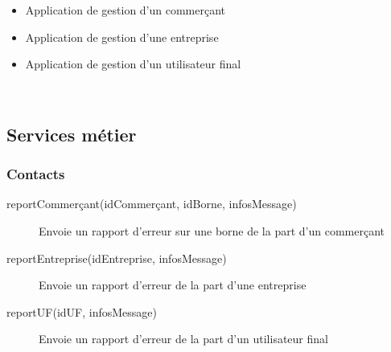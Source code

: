 \begin{itemize}
  \item Application de gestion d'un commerçant
  \item Application de gestion d'une entreprise
  \item Application de gestion d'un utilisateur final
\end{itemize}
~\\

\subsection{Services métier}
% 


\subsubsection{Contacts}
\begin{description}
  \item[reportCommerçant(idCommerçant, idBorne, infosMessage)] Envoie un
    rapport d'erreur sur une borne de la part d'un commerçant
  \item[reportEntreprise(idEntreprise, infosMessage)] Envoie un rapport
    d'erreur de la part d'une entreprise
  \item[reportUF(idUF, infosMessage)] Envoie un rapport d'erreur de la part
    d'un utilisateur final
\end{description}

